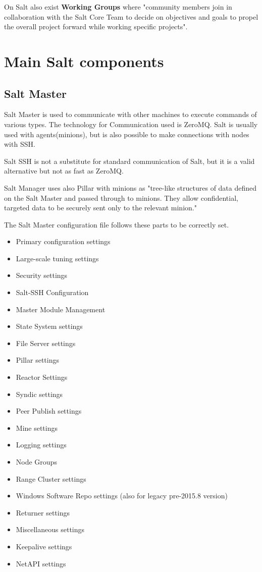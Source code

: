 \documentclass[12pt,a4paper,openright,twoside]{book}
\begin{document}
On Salt also exist \textbf{Working Groups} where "community members join in collaboration with the Salt Core Team to decide on objectives and goals to propel the overall project forward while working specific projects"\cite{saltWG}.

\section{Main Salt components}

\subsection{Salt Master}

Salt Master is used to communicate with other machines to execute commands of various types.
The technology for Communication used is ZeroMQ. Salt is usually used with agents(minions), but is also possible to make connections with nodes with SSH.

Salt SSH is not a substitute for standard communication of Salt, but it is a valid alternative but not as fast as ZeroMQ\cite{saltSSH}.

Salt Manager uses also Pillar with minions as
"tree-like structures of data defined on the Salt Master and passed through to minions.
They allow confidential, targeted data to be securely sent only to the relevant minion."\cite{saltDocPillar}

The Salt Master configuration file follows these parts to be correctly set.
\begin{itemize}
    \item Primary configuration settings
    \item Large-scale tuning settings
    \item Security settings
    \item Salt-SSH Configuration
    \item Master Module Management
    \item State System settings
    \item File Server settings
    \item Pillar settings
    \item Reactor Settings
    \item Syndic settings
    \item Peer Publish settings
    \item Mine settings
    \item Logging settings
    \item Node Groups
    \item Range Cluster settings
    \item Windows Software Repo settings (also for legacy pre-2015.8 version)
    \item Returner settings
    \item Miscellaneous settings
    \item Keepalive settings
    \item NetAPI settings
    \end{itemize}
\end{document}
